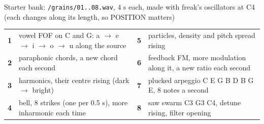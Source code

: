 \documentclass{article}
\begin{document}
\vspace{1.5mm}
\begin{minipage}[t]{166mm}\vspace{0pt}
\begin{card}{Starter bank: \texttt{/grains/01..08.wav}, 4 s each, made with freak's oscillators at C4 \quad\textmd{\fontsize{6.5}{7}\selectfont (each changes along its length, so POSITION matters)}}
\fontsize{7.2}{8.7}\selectfont
\begin{tabularx}{\linewidth}{@{}>{\bfseries}l L >{\bfseries}l L@{}}
1 & vowel FOF on C and G: a \(\to\) e \(\to\) i \(\to\) o \(\to\) u along the source &
5 & particles, density and pitch spread rising \\
2 & paraphonic chords, a new chord each second &
6 & feedback FM, more modulation along it, a new ratio each second \\
3 & harmonics, their centre rising (dark \(\to\) bright) &
7 & plucked arpeggio C E G B D B G E, 8 notes a second \\
4 & bell, 8 strikes (one per 0.5 s), more inharmonic each time &
8 & saw swarm C3 G3 C4, detune rising, filter opening \\
\end{tabularx}
\end{card}


\end{minipage}
\end{document}
